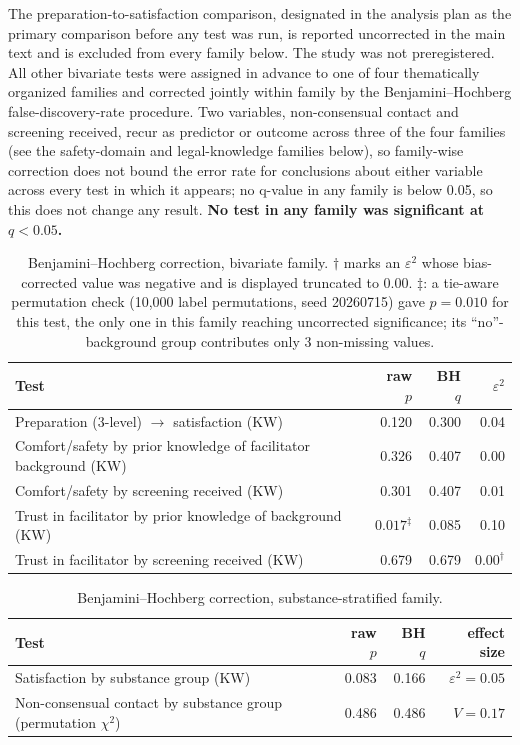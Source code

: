 \documentclass[12pt]{article}
\begin{document}
The preparation-to-satisfaction comparison, designated in the analysis plan as the primary comparison
before any test was run, is reported uncorrected in the main text and is excluded from every family below.
The study was not preregistered. All other bivariate tests were assigned in advance to one of four
thematically organized families and corrected jointly within family by the Benjamini--Hochberg
false-discovery-rate procedure. Two variables, non-consensual contact and screening received, recur as
predictor or outcome across three of the four families (see the safety-domain and legal-knowledge families
below), so family-wise correction does not bound the error rate for conclusions about either variable across
every test in which it appears; no q-value in any family is below 0.05, so this does not change any result.
\textbf{No test in any family was significant at $q<0.05$.}

\begin{table}[htbp]
\centering
\caption{Benjamini--Hochberg correction, bivariate family. $\dagger$ marks an $\varepsilon^2$ whose
bias-corrected value was negative and is displayed truncated to 0.00. $\ddagger$: a tie-aware permutation
check (10,000 label permutations, seed 20260715) gave $p=0.010$ for this test, the only one in this family
reaching uncorrected significance; its ``no''-background group contributes only 3 non-missing values.}
\begin{tabular}{lrrr}
\toprule
Test & raw $p$ & BH $q$ & $\varepsilon^2$ \\
\midrule
Preparation (3-level) $\rightarrow$ satisfaction (KW) & 0.120 & 0.300 & 0.04 \\
Comfort/safety by prior knowledge of facilitator background (KW) & 0.326 & 0.407 & 0.00 \\
Comfort/safety by screening received (KW) & 0.301 & 0.407 & 0.01 \\
Trust in facilitator by prior knowledge of background (KW) & $0.017^{\ddagger}$ & 0.085 & 0.10 \\
Trust in facilitator by screening received (KW) & 0.679 & 0.679 & $0.00^{\dagger}$ \\
\bottomrule
\end{tabular}
\end{table}

\begin{table}[htbp]
\centering
\caption{Benjamini--Hochberg correction, substance-stratified family.}
\begin{tabular}{lrrr}
\toprule
Test & raw $p$ & BH $q$ & effect size \\
\midrule
Satisfaction by substance group (KW) & 0.083 & 0.166 & $\varepsilon^2=0.05$ \\
Non-consensual contact by substance group (permutation $\chi^2$) & 0.486 & 0.486 & $V=0.17$ \\
\bottomrule
\end{tabular}
\end{table}
\end{document}
